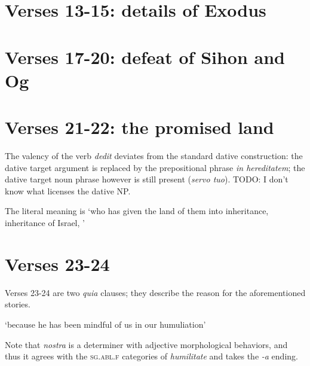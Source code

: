 \documentclass[a4paper, 12pt]{article}
\newcommand{\form}[1]{\emph{#1}}
\newcommand*{\category}[1]{\textsc{#1}}
\newcommand{\translate}[1]{`#1'}
\begin{document}
\section{Verses 13-15: details of Exodus}


\section{Verses 17-20: defeat of Sihon and Og}

\section{Verses 21-22: the promised land}

The valency of the verb \form{dedit} deviates from the standard dative construction:
the dative target argument is replaced by 
the prepositional phrase \form{in hereditatem};
the dative target noun phrase however is still present 
(\form{servo tuo}).
TODO: I don't know what licenses the dative NP.

The literal meaning is 
\translate{who has given the land of them into inheritance, 
inheritance of Israel, }

\section{Verses 23-24}

Verses 23-24 are two \form{quia} clauses; 
they describe the reason for the aforementioned stories.


\translate{because he has been mindful of us in our humuliation}

Note that \form{nostra} is a determiner 
with adjective morphological behaviors,
and thus it agrees with the \category{sg.abl.f} categories of \form{humilitate}
and takes the \form{-a} ending.
\end{document}
